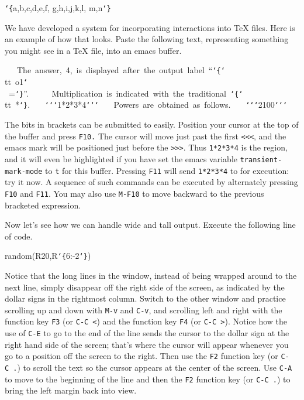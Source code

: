 {\ttfamily\obeylines
{\tt\char`\{}a,b,c,d,e,f,
g,h,i,j,k,l,
m,n{\tt\char`\}}
}

\smallskip

We have developed a system for incorporating \Mtwo interactions into TeX
files.  Here is an example of how that looks.  Paste the following text,
representing something you might see in a TeX file, into an emacs buffer.

\medskip

{\ttfamily\obeylines\scriptsize
~~~The~answer,~4,~is~displayed~after~the~output~label~``{\tt\char`\{}{\tt\char`\\}tt~o1{\tt\char`\\}~={\tt\char`\}}''.~~
~~~Multiplication~is~indicated~with~the~traditional~{\tt\char`\{}{\tt\char`\\}tt~*{\tt\char`\}}.
~~~{\tt \char`\<}{\tt\char`\<}{\tt\char`\<}1*2*3*4{\tt\char`\>}{\tt\char`\>}{\tt\char`\>}
~~~Powers~are~obtained~as~follows.
~~~{\tt\char`\<}{\tt\char`\<}{\tt\char`\<}2{}100{\tt\char`\>}{\tt\char`\>}{\tt\char`\>}
}

\smallskip

The bits in brackets can be submitted to \Mtwo easily.  Position your
cursor at the top of the buffer and press {\tt {}F10.}  The cursor will move 
just past the first {\tt {<}<<}, and the emacs mark will be positioned just 
before the {\tt {}>>>}.  Thus {\tt {}1*2*3*4} is the region, and it will
even be highlighted if you have set the emacs variable {\tt {}transient-mark-mode}
to {\tt {}t} for this buffer.  Pressing {\tt {}F11} will send {\tt {}1*2*3*4} 
to \Mtwo for execution: try it now.  A sequence of such \Mtwo commands 
can be executed by alternately pressing {\tt {}F10} and {\tt {}F11}.  You may
also use {\tt {}M-F10} to move backward to the previous bracketed expression.

Now let's see how we can handle wide and tall \Mtwo output.  Execute the
following line of code.

\smallskip

{\ttfamily\obeylines
random(R{}20,R{}{\tt\char`\{}6:-2{\tt\char`\}})
}

\smallskip

Notice that the long lines in the \Mtwo window, instead of being wrapped
around to the next line, simply disappear off the right side of the screen,
as indicated by the dollar signs in the rightmost column.  Switch to the
other window and practice scrolling up and down with {\tt {}M-v} and {\tt {}C-v}, 
and scrolling left and right with the function key {\tt {}F3} (or {\tt {}C-C\ <}) 
and the function key {\tt {}F4} (or {\tt {}C-C\ >}).  Notice how the use of
{\tt {}C-E} to go to the end of the line
sends the cursor to the dollar sign at the right hand side of the screen;
that's where the cursor will appear whenever you go to a position off the
screen to the right.  Then use the {\tt {}F2} function key (or {\tt {}C-C\ .}) to 
scroll the text so the cursor appears at the center of the screen.  Use {\tt {}C-A} to 
move to the beginning of the line and then the {\tt {}F2} function key 
(or {\tt {}C-C\ .}) to bring the left margin back into view.

